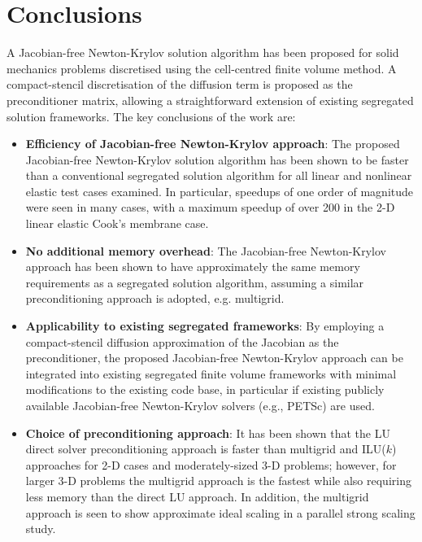\documentclass[sn-mathphys,Numbered]{sn-jnl}%
\begin{document}
\section{Conclusions} \label{sec:conclusion}
A Jacobian-free Newton-Krylov solution algorithm has been proposed for solid mechanics problems discretised using the cell-centred finite volume method.
A compact-stencil discretisation of the diffusion term is proposed as the preconditioner matrix, allowing a straightforward extension of existing segregated solution frameworks.
The key conclusions of the work are:
\begin{itemize}
	\item \textbf{Efficiency of Jacobian-free Newton-Krylov approach}: The proposed Jacobian-free Newton-Krylov solution algorithm has been shown to be faster than a conventional segregated solution algorithm for all linear and nonlinear elastic test cases examined. In particular, speedups of one order of magnitude were seen in many cases, with a maximum speedup of over 200 in the 2-D linear elastic Cook's membrane case.

	\item \textbf{No additional memory overhead}: The Jacobian-free Newton-Krylov approach has been shown to have approximately the same memory requirements as a segregated solution algorithm, assuming a similar preconditioning approach is adopted, e.g. multigrid.
	
	\item \textbf{Applicability to existing segregated frameworks}: By employing a compact-stencil diffusion approximation of the Jacobian as the preconditioner, the proposed Jacobian-free Newton-Krylov approach can be integrated into existing segregated finite volume frameworks with minimal modifications to the existing code base, in particular if existing publicly available Jacobian-free Newton-Krylov solvers (e.g., PETSc) are used.


	\item \textbf{Choice of preconditioning approach}: It has been shown that the LU direct solver preconditioning approach is faster than multigrid and ILU($k$) approaches for 2-D cases and moderately-sized 3-D problems; however, for larger 3-D problems the multigrid approach is the fastest while also requiring less memory than the direct LU approach. In addition, the multigrid approach is seen to show approximate ideal scaling in a parallel strong scaling study.
	

\end{itemize}
\end{document}
